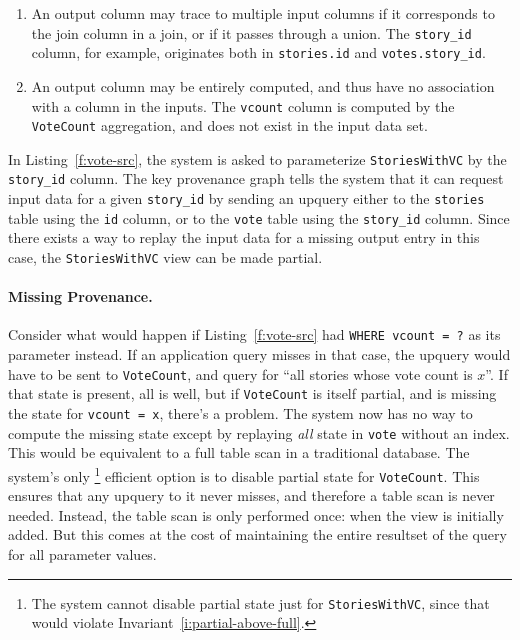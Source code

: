 \begin{enumerate}
  \item An output column may trace to multiple input columns if it corresponds
    to the join column in a join, or if it passes through a union. The
    \texttt{story\_id} column, for example, originates both in
    \texttt{stories.id} and \texttt{votes.story\_id}.
  \item An output column may be entirely computed, and thus have no association
    with a column in the inputs. The \texttt{vcount} column is computed by the
    \texttt{VoteCount} aggregation, and does not exist in the input data set.
\end{enumerate}

In Listing~\ref{f:vote-src}, the system is asked to parameterize
\texttt{StoriesWithVC} by the \texttt{story\_id} column. The key provenance
graph tells the system that it can request input data for a given
\texttt{story\_id} by sending an upquery either to the \texttt{stories} table
using the \texttt{id} column, or to the \texttt{vote} table using the
\texttt{story\_id} column. Since there exists a way to replay the input data for
a missing output entry in this case, the \texttt{StoriesWithVC} view can be made
partial.

\paragraph{Missing Provenance.}
Consider what would happen if Listing~\ref{f:vote-src} had \texttt{WHERE vcount
= ?} as its parameter instead. If an application query misses in that case, the
upquery would have to be sent to \texttt{VoteCount}, and query for ``all stories
whose vote count is $x$''. If that state is present, all is well, but if
\texttt{VoteCount} is itself partial, and is missing the state for
\texttt{vcount = x}, there's a problem. The system now has no way to compute the
missing state except by replaying \emph{all} state in \texttt{vote} without an
index. This would be equivalent to a full table scan in a traditional database.
The system's only%
%
\footnote{The system cannot disable partial state just for
\texttt{StoriesWithVC}, since that would violate
Invariant~\ref{i:partial-above-full}.}
%
efficient option is to disable partial
state for \texttt{VoteCount}. This ensures that any upquery to it never misses,
and therefore a table scan is never needed. Instead, the table scan is only
performed once: when the view is initially added. But this comes at the cost of
maintaining the entire resultset of the query for all parameter values.

